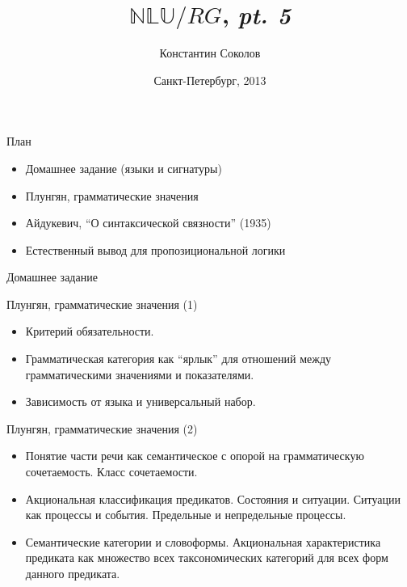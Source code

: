 \documentclass{beamer}
\begin{document}
\title{\huge{$\mathbb{NLU}/RG$, \textit{pt. 5}}}
\author{Константин Соколов}
\date{Санкт-Петербург, 2013} 
\begin{frame}
    \thispagestyle{empty}
    \titlepage
\end{frame}

\begin{frame}{План}
    \setcounter{framenumber}{1}
    \begin{itemize}
        \item Домашнее задание (языки и сигнатуры)
        \item Плунгян, грамматические значения 
        \item Айдукевич, ``О синтаксической связности'' (1935)
        \item Естественный вывод для пропозициональной логики
    \end{itemize}
\end{frame}

\begin{frame}{Домашнее задание}
\end{frame}

\begin{frame}{Плунгян, грамматические значения (1)}
\begin{itemize}
  \item Критерий обязательности.
  \item Грамматическая категория как ``ярлык'' для отношений между грамматическими значениями и показателями.
  \item Зависимость от языка и универсальный набор.
\end{itemize}
\end{frame}

\begin{frame}{Плунгян, грамматические значения (2)}
\begin{itemize}
  \item Понятие части речи как семантическое с опорой на грамматическую сочетаемость. Класс сочетаемости. 
  \item Акциональная классификация предикатов. Состояния и ситуации. Ситуации как процессы и события. Предельные и непредельные процессы.
  \item Семантические категории и словоформы. Акциональная характеристика предиката как множество всех таксономических категорий для всех форм данного предиката.
\end{itemize}
\end{frame}
\end{document}
